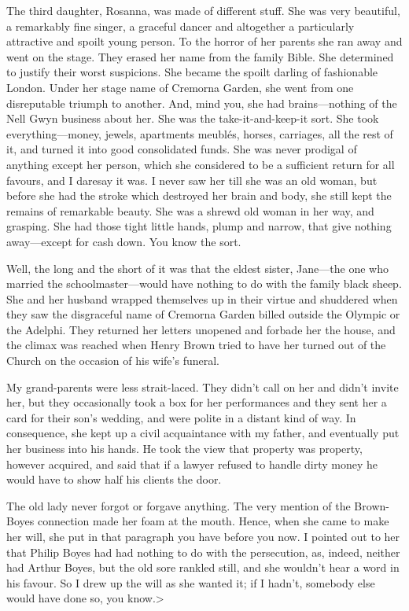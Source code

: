 The third daughter, Rosanna, was made of different stuff. She was very beautiful, a remarkably fine singer, a graceful dancer and altogether a particularly attractive and spoilt young person. To the horror of her parents she ran away and went on the stage. They erased her name from the family Bible. She determined to justify their worst suspicions. She became the spoilt darling of fashionable London. Under her stage name of Cremorna Garden, she went from one disreputable triumph to another. And, mind you, she had brains—nothing of the Nell Gwyn business about her. She was the take-it-and-keep-it sort. She took everything—money, jewels, apartments meublés, horses, carriages, all the rest of it, and turned it into good consolidated funds. She was never prodigal of anything except her person, which she considered to be a sufficient return for all favours, and I daresay it was. I never saw her till she was an old woman, but before she had the stroke which destroyed her brain and body, she still kept the remains of remarkable beauty. She was a shrewd old woman in her way, and grasping. She had those tight little hands, plump and narrow, that give nothing away—except for cash down. You know the sort.

Well, the long and the short of it was that the eldest sister, Jane—the one who married the schoolmaster—would have nothing to do with the family black sheep. She and her husband wrapped themselves up in their virtue and shuddered when they saw the disgraceful name of Cremorna Garden billed outside the Olympic or the Adelphi. They returned her letters unopened and forbade her the house, and the climax was reached when Henry Brown tried to have her turned out of the Church on the occasion of his wife's funeral.

My grand-parents were less strait-laced. They didn't call on her and didn't invite her, but they occasionally took a box for her performances and they sent her a card for their son's wedding, and were polite in a distant kind of way. In consequence, she kept up a civil acquaintance with my father, and eventually put her business into his hands. He took the view that property was property, however acquired, and said that if a lawyer refused to handle dirty money he would have to show half his clients the door.

The old lady never forgot or forgave anything. The very mention of the Brown-Boyes connection made her foam at the mouth. Hence, when she came to make her will, she put in that paragraph you have before you now. I pointed out to her that Philip Boyes had had nothing to do with the persecution, as, indeed, neither had Arthur Boyes, but the old sore rankled still, and she wouldn't hear a word in his favour. So I drew up the will as she wanted it; if I hadn't, somebody else would have done so, you know.>

